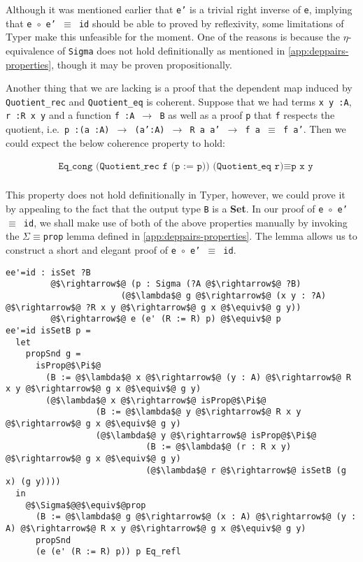 \documentclass[12pt,twoside,maitrise]{dms}
\theoremstyle{definition}
\numberwithin{equation}{section}
\numberwithin{table}{chapter}
\numberwithin{figure}{chapter}
\newcommand\id[1] {\texttt{#1}}
\newcommand\fn[1] {\texttt{#1}}
\begin{document}
Although it was mentioned earlier that \id{e'} is a trivial right inverse of
\id{e}, implying that \fn{e $\circ{}$ e' $\equiv$ id} should be able to proved
by reflexivity, some limitations of Typer make this unfeasible for the moment.
One of the reasons is because the $\eta$-equivalence of \id{Sigma} does not hold
definitionally as mentioned in \autoref{app:deppairs-properties}, though it may
be proven propositionally.

Another thing that we are lacking is a proof that the dependent map induced by
\id{Quotient\_rec} and \id{Quotient\_eq} is coherent. Suppose that we had terms
\fn{x y :\@ A}, \fn{r :\@ R x y} and a function \fn{f :\@ A $\rightarrow$ B} as well as a
proof \id{p} that \id{f} respects the quotient, i.e.\ \fn{p :\@ (a :\@ A) $\rightarrow$
  (a':A) $\rightarrow$ R a a' $\rightarrow$ f a $\equiv$ f a'}. Then we could
expect the below coherence property to hold:

\begin{align*}
  & \fn{Eq\_cong (Quotient\_rec f (p := p)) (Quotient\_eq r)} \equiv \fn{p x y} \\
\end{align*}

This property does not hold definitionally in Typer, however, we could prove it
by appealing to the fact that the output type \id{B} is a \textbf{Set}. In our
proof of \fn{e $\circ{}$ e' $\equiv$ id}, we shall make use of both of the above
properties manually by invoking the \id{$\Sigma$$\equiv$prop} lemma defined in
\autoref{app:deppairs-properties}. The lemma allows us to construct a short and
elegant proof of \fn{e $\circ{}$ e' $\equiv$ id}.

\begin{verbatim}
ee'=id : isSet ?B
         @$\rightarrow$@ (p : Sigma (?A @$\rightarrow$@ ?B)
                       (@$\lambda$@ g @$\rightarrow$@ (x y : ?A) @$\rightarrow$@ ?R x y @$\rightarrow$@ g x @$\equiv$@ g y))
         @$\rightarrow$@ e (e' (R := R) p) @$\equiv$@ p
ee'=id isSetB p =
  let
    propSnd g =
      isProp@$\Pi$@
        (B := @$\lambda$@ x @$\rightarrow$@ (y : A) @$\rightarrow$@ R x y @$\rightarrow$@ g x @$\equiv$@ g y)
        (@$\lambda$@ x @$\rightarrow$@ isProp@$\Pi$@
                  (B := @$\lambda$@ y @$\rightarrow$@ R x y @$\rightarrow$@ g x @$\equiv$@ g y)
                  (@$\lambda$@ y @$\rightarrow$@ isProp@$\Pi$@
                            (B := @$\lambda$@ (r : R x y) @$\rightarrow$@ g x @$\equiv$@ g y)
                            (@$\lambda$@ r @$\rightarrow$@ isSetB (g x) (g y))))
  in
    @$\Sigma$@@$\equiv$@prop
      (B := @$\lambda$@ g @$\rightarrow$@ (x : A) @$\rightarrow$@ (y : A) @$\rightarrow$@ R x y @$\rightarrow$@ g x @$\equiv$@ g y)
      propSnd
      (e (e' (R := R) p)) p Eq_refl
\end{verbatim}
\end{document}
